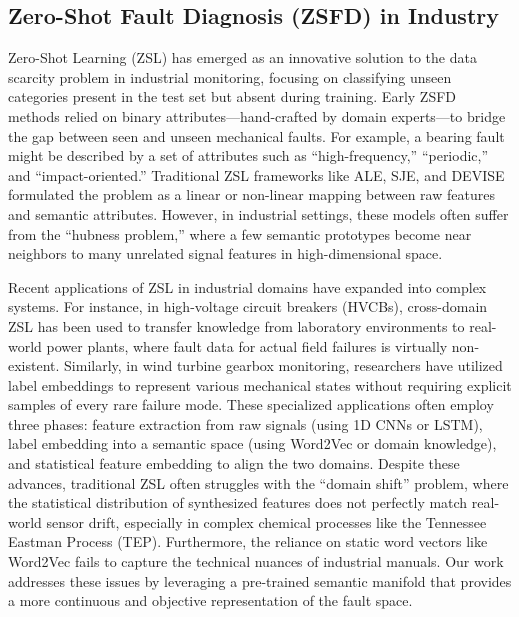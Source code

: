 \documentclass[journal]{IEEEtran}
\begin{document}
\subsection{Zero-Shot Fault Diagnosis (ZSFD) in Industry}
Zero-Shot Learning (ZSL) has emerged as an innovative solution to the data scarcity problem in industrial monitoring, focusing on classifying unseen categories present in the test set but absent during training. Early ZSFD methods relied on binary attributes—hand-crafted by domain experts—to bridge the gap between seen and unseen mechanical faults. For example, a bearing fault might be described by a set of attributes such as ``high-frequency,'' ``periodic,'' and ``impact-oriented.'' Traditional ZSL frameworks like ALE, SJE, and DEVISE formulated the problem as a linear or non-linear mapping between raw features and semantic attributes. However, in industrial settings, these models often suffer from the ``hubness problem,'' where a few semantic prototypes become near neighbors to many unrelated signal features in high-dimensional space.

Recent applications of ZSL in industrial domains have expanded into complex systems. For instance, in high-voltage circuit breakers (HVCBs), cross-domain ZSL has been used to transfer knowledge from laboratory environments to real-world power plants, where fault data for actual field failures is virtually non-existent. Similarly, in wind turbine gearbox monitoring, researchers have utilized label embeddings to represent various mechanical states without requiring explicit samples of every rare failure mode. These specialized applications often employ three phases: feature extraction from raw signals (using 1D CNNs or LSTM), label embedding into a semantic space (using Word2Vec or domain knowledge), and statistical feature embedding to align the two domains. Despite these advances, traditional ZSL often struggles with the ``domain shift'' problem, where the statistical distribution of synthesized features does not perfectly match real-world sensor drift, especially in complex chemical processes like the Tennessee Eastman Process (TEP). Furthermore, the reliance on static word vectors like Word2Vec fails to capture the technical nuances of industrial manuals. Our work addresses these issues by leveraging a pre-trained semantic manifold that provides a more continuous and objective representation of the fault space.
\end{document}
